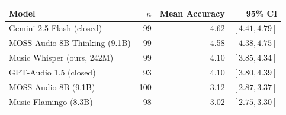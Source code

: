 \begin{tabular}{lrrr}
\toprule
\textbf{Model} & \textbf{$n$} & \textbf{Mean Accuracy} & \textbf{95\% CI} \\
\midrule
Gemini 2.5 Flash (closed) & 99 & 4.62 & $[4.41, 4.79]$ \\
MOSS-Audio 8B-Thinking (9.1B) & 99 & 4.58 & $[4.38, 4.75]$ \\
Music Whisper (ours, 242M) & 99 & 4.10 & $[3.85, 4.34]$ \\
GPT-Audio 1.5 (closed) & 93 & 4.10 & $[3.80, 4.39]$ \\
MOSS-Audio 8B (9.1B) & 100 & 3.12 & $[2.87, 3.37]$ \\
Music Flamingo (8.3B) & 98 & 3.02 & $[2.75, 3.30]$ \\
\bottomrule
\end{tabular}
